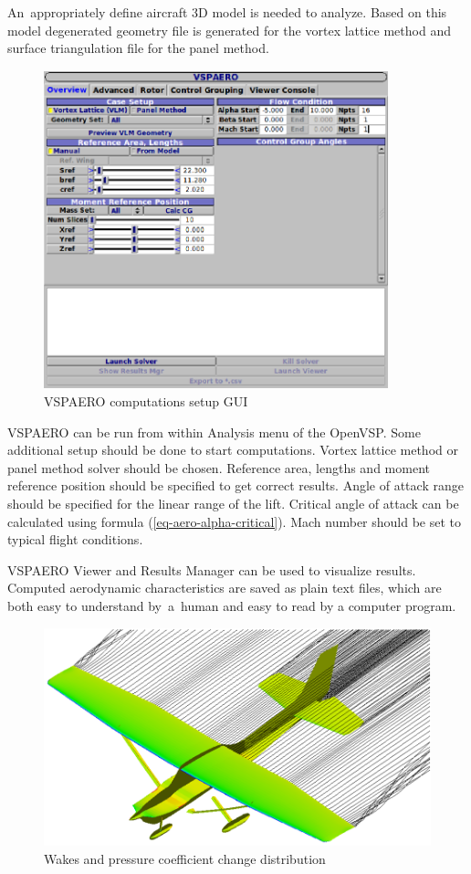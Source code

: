An appropriately define aircraft 3D model is needed to analyze. \cite{Litherland2015-2} Based on this model degenerated geometry file is generated for the vortex lattice method and surface triangulation file for the panel method.

\begin{figure}
  \centering
  \includegraphics[width=100mm]{images/vspaero_02.eps}
  \caption{VSPAERO computations setup GUI}
\end{figure}

VSPAERO can be run from within Analysis menu of the OpenVSP. Some additional setup should be done to start computations. Vortex lattice method or panel method solver should be chosen. Reference area, lengths and moment reference position should be specified to get correct results. Angle of attack range should be specified for the linear range of the lift. Critical angle of attack can be calculated using formula (\ref{eq-aero-alpha-critical}). Mach number should be set to typical flight conditions.

VSPAERO Viewer and Results Manager can be used to visualize results. Computed aerodynamic characteristics are saved as plain text files, which are both easy to understand by a human and easy to read by a computer program.

\begin{figure}
  \centering
  \includegraphics[width=120mm]{images/vspaero_03.eps}
  \caption{Wakes and pressure coefficient change distribution}
\end{figure}

